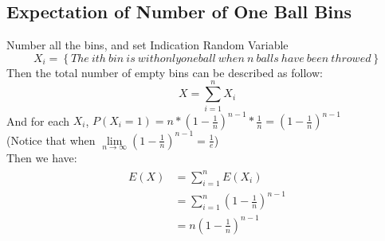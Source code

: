 \documentclass[oneside]{homework} %
\begin{document}
\subsection {Expectation of Number of One Ball Bins}
Number all the bins, and set Indication Random Variable 
$$X_{i} = \left\{The~ith~bin~is~with only one ball~when~n~balls~have~been~throwed \right\}$$
Then the total number of empty bins can be described as follow:
$$ X = \sum_{i=1}^{n}X_{i}$$
And for each $X_{i}$, $P(X_{i}=1) = n*(1-\frac{1}{n})^{n-1}*\frac{1}{n} =(1-\frac{1}{n})^{n-1} $ \\
(Notice that when $\lim\limits_{n\to\infty}(1-\frac{1}{n})^{n-1} = \frac{1}{e}$)
\\ Then we have:
\begin{eqnarray}
  \begin{split}
	E(X) &= \sum_{i=1}^{n}E(X_{i}) \\
	 &= \sum_{i=1}^{n}(1-\frac{1}{n})^{n-1} \\
	 &= n(1-\frac{1}{n})^{n-1} \\
  \end{split}
\end{eqnarray}
\end{document}

